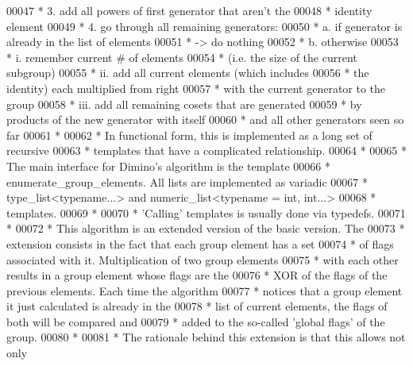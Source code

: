 \begin{DoxyCode}
00047 \textcolor{comment}{ * 3. add all powers of first generator that aren't the}
00048 \textcolor{comment}{ *    identity element}
00049 \textcolor{comment}{ * 4. go through all remaining generators:}
00050 \textcolor{comment}{ *        a. if generator is already in the list of elements}
00051 \textcolor{comment}{ *                -> do nothing}
00052 \textcolor{comment}{ *        b. otherwise}
00053 \textcolor{comment}{ *                i.   remember current # of elements}
00054 \textcolor{comment}{ *                     (i.e. the size of the current subgroup)}
00055 \textcolor{comment}{ *                ii.  add all current elements (which includes}
00056 \textcolor{comment}{ *                     the identity) each multiplied from right}
00057 \textcolor{comment}{ *                     with the current generator to the group}
00058 \textcolor{comment}{ *                iii. add all remaining cosets that are generated}
00059 \textcolor{comment}{ *                     by products of the new generator with itself}
00060 \textcolor{comment}{ *                     and all other generators seen so far}
00061 \textcolor{comment}{ *}
00062 \textcolor{comment}{ * In functional form, this is implemented as a long set of recursive}
00063 \textcolor{comment}{ * templates that have a complicated relationship.}
00064 \textcolor{comment}{ *}
00065 \textcolor{comment}{ * The main interface for Dimino's algorithm is the template}
00066 \textcolor{comment}{ * enumerate\_group\_elements. All lists are implemented as variadic}
00067 \textcolor{comment}{ * type\_list<typename...> and numeric\_list<typename = int, int...>}
00068 \textcolor{comment}{ * templates.}
00069 \textcolor{comment}{ *}
00070 \textcolor{comment}{ * 'Calling' templates is usually done via typedefs.}
00071 \textcolor{comment}{ *}
00072 \textcolor{comment}{ * This algorithm is an extended version of the basic version. The}
00073 \textcolor{comment}{ * extension consists in the fact that each group element has a set}
00074 \textcolor{comment}{ * of flags associated with it. Multiplication of two group elements}
00075 \textcolor{comment}{ * with each other results in a group element whose flags are the}
00076 \textcolor{comment}{ * XOR of the flags of the previous elements. Each time the algorithm}
00077 \textcolor{comment}{ * notices that a group element it just calculated is already in the}
00078 \textcolor{comment}{ * list of current elements, the flags of both will be compared and}
00079 \textcolor{comment}{ * added to the so-called 'global flags' of the group.}
00080 \textcolor{comment}{ *}
00081 \textcolor{comment}{ * The rationale behind this extension is that this allows not only}

\end{DoxyCode}
